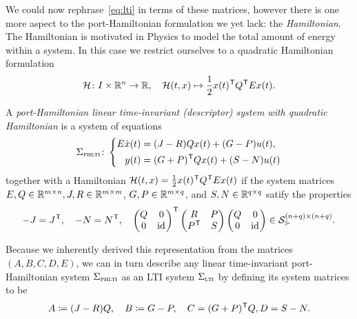 We could now rephrase~\eqref{eq:lti} in terms of these matrices, however there is one more aspect to the port-Hamiltonian formulation we yet lack: the \emph{Hamiltonian}.
The Hamiltonian is motivated in Physics to model the total amount of energy within a system.
In this case we restrict ourselves to a quadratic Hamiltonian formulation
\begin{equation}\label{eq:quadratic-hamiltonian}
    \mathcal{H} \colon I \times \mathbb{R}^{n} \to \mathbb{R},\quad \mathcal{H}(t, x) \mapsto \frac{1}{2} x(t)^{\mkern1mu \mathsf{T}} Q^{\mkern1mu \mathsf{T}} E x(t).
\end{equation}

\begin{definition}\label{def:phlti}
    A \emph{port-Hamiltonian linear time-invariant (descriptor) system with quadratic Hamiltonian} is a system of equations
    \begin{equation}\label{eq:phlti}
        \Sigma_{\textnormal{\scshape phlti}} \colon \left\lbrace
        \begin{aligned}
            E \dot{x}(t) &= (J - R) Q x(t) + (G - P) u(t), \\
            y(t) &= (G + P)^{\mkern1mu \mathsf{T}} Q x(t) + (S - N) u(t)
        \end{aligned}
        \right.
    \end{equation}
    together with a Hamiltonian $\mathcal{H}(t, x) = \frac{1}{2} x(t)^{\mkern1mu \mathsf{T}} Q^{\mkern1mu \mathsf{T}} E x(t)$ if the system matrices $E, Q \in \mathbb{R}^{m \times n}, J, R \in \mathbb{R}^{m \times m}$, $G, P \in \mathbb{R}^{m \times q}$, and $S, N \in \mathbb{R}^{q \times q}$ satify the properties
    \begin{equation}\label{eq:ph-matrix-structure}
        -J = J^{\mkern1mu \mathsf{T}},\quad -N = N^{\mkern1mu \mathsf{T}},\quad
        \begin{pmatrix}
            Q & 0 \\
            0 & \text{id}_{}
        \end{pmatrix}^{\mkern1mu \mathsf{T}}
        \begin{pmatrix}
            R & P \\
            P^{\mkern1mu \mathsf{T}} & S
        \end{pmatrix}
        \begin{pmatrix}
            Q & 0 \\
            0 & \text{id}_{}
        \end{pmatrix}
        \in \mathcal{S}_{\curlyeqsucc}^{(n + q) \times (n + q)}.
    \end{equation}
\end{definition}

\begin{remark}
    Because we inherently derived this representation from the matrices $(A, B, C, D, E)$, we can in turn describe any linear time-invariant port-Hamiltonian system $\Sigma_{\textnormal{\scshape phlti}}$ as an \ac{LTI} system $\Sigma_{\textnormal{\scshape lti}}$ by defining its system matrices to be
    \begin{equation*}
        A \coloneqq (J - R) Q,\quad B \coloneqq G - P,\quad C = (G + P)^{\mkern1mu \mathsf{T}} Q, D = S - N.
    \end{equation*}
\end{remark}

